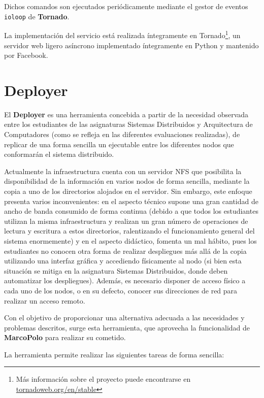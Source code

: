 Dichos comandos son ejecutados periódicamente mediante el gestor de eventos \texttt{ioloop} de \textbf{Tornado}.

La implementación del servicio está realizada íntegramente en Tornado\footnote{Más información sobre el proyecto puede encontrarse en \href{http://www.tornadoweb.org/en/stable/}{tornadoweb.org/en/stable}}, un servidor web ligero asíncrono implementado íntegramente en Python y mantenido por Facebook.

\section{Deployer}

El \textbf{Deployer} es una herramienta concebida a partir de la necesidad observada entre los estudiantes de las asignaturas Sistemas Distribuidos y Arquitectura de Computadores (como se refleja en las diferentes evaluaciones\citationneeded %
realizadas), de replicar de una forma sencilla un ejecutable entre los diferentes nodos que conformarán el sistema distribuido.

Actualmente la infraestructura cuenta con un servidor NFS que posibilita la disponibilidad de la información en varios nodos de forma sencilla, mediante la copia a uno de los directorios alojados en el servidor. Sin embargo, este enfoque presenta varios inconvenientes: en el aspecto técnico supone una gran cantidad de ancho de banda consumido de forma continua (debido a que todos los estudiantes utilizan la misma infraestructura y realizan un gran número de operaciones de lectura y escritura a estos directorios, ralentizando el funcionamiento general del sistema enormemente) y en el aspecto didáctico, fomenta un mal hábito, pues los estudiantes no conocen otra forma de realizar despliegues más allá de la copia utilizando una interfaz gráfica y accediendo físicamente al nodo (si bien esta situación se mitiga en la asignatura Sistemas Distribuidos, donde deben automatizar los despliegues). Además, es necesario disponer de acceso físico a cada uno de los nodos, o en su defecto, conocer sus direcciones de red para realizar un acceso remoto.

Con el objetivo de proporcionar una alternativa adecuada a las necesidades y problemas descritos, surge esta herramienta, que aprovecha la funcionalidad de \textbf{MarcoPolo} para realizar su cometido.

La herramienta permite realizar las siguientes tareas de forma sencilla:

